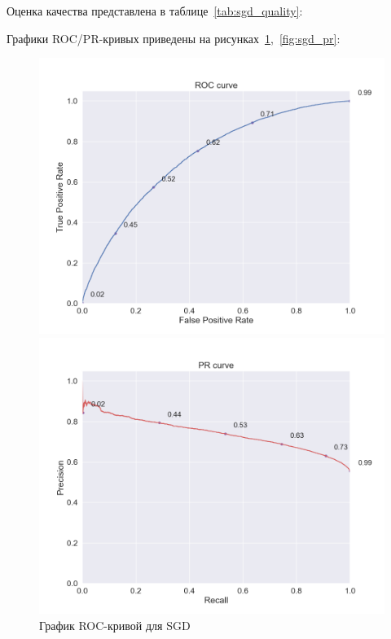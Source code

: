 Оценка качества представлена в таблице~\ref{tab:sgd_quality}:

\begin{table}[h]
    \caption{Значения метрик для SGD}
    \label{tab:sgd_quality}
\end{table}

Графики ROC/PR-кривых приведены на рисунках~\ref{fig:sgd_roc},~\ref{fig:sgd_pr}:

\begin{figure}[h!]
\centering
\begin{minipage}{.5\textwidth}
\centering
\includegraphics[width=1.0\linewidth]{images/sgd/roc_curve}
\caption{График ROC-кривой для SGD}
\label{fig:sgd_roc}
\end{minipage}%
\begin{minipage}{.5\textwidth}
\centering
\includegraphics[width=1.0\linewidth]{images/sgd/pr_curve}

\end{minipage}
\end{figure}

